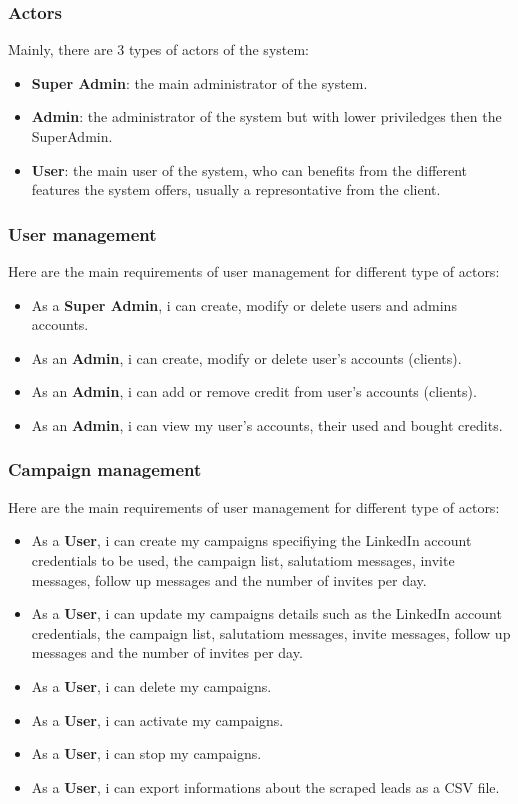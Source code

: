 \subsubsection{Actors}
Mainly, there are 3 types of actors of the system:
\begin{itemize}
  \item \textbf{Super Admin}: the main administrator of the system.
  \item \textbf{Admin}: the administrator of the system but with lower priviledges then the SuperAdmin.
  \item \textbf{User}: the main user of the system, who can benefits from the different features the system offers, usually a represontative from the client. 
\end{itemize}
\subsubsection{User management}
Here are the main requirements of user management for different type of actors:
\begin{itemize}
  \item As a \textbf{Super Admin}, i can create, modify or delete users and admins accounts.
  \item As an \textbf{Admin}, i can create, modify or delete user's accounts (clients).
  \item As an \textbf{Admin}, i can add or remove credit from user's accounts (clients).
	\item As an \textbf{Admin}, i can view my user's accounts, their used and bought credits.
\end{itemize}
\subsubsection{Campaign management}
Here are the main requirements of user management for different type of actors:
\begin{itemize}
  \item As a \textbf{User}, i can create my campaigns specifiying the LinkedIn account credentials to be used, the campaign list, salutatiom messages, invite messages, follow up messages and the number of invites per day.
  \item As a \textbf{User}, i can update my campaigns details such as the LinkedIn account credentials, the campaign list, salutatiom messages, invite messages, follow up messages and the number of invites per day.
  \item As a \textbf{User}, i can delete my campaigns.
  \item As a \textbf{User}, i can activate my campaigns.
  \item As a \textbf{User}, i can stop my campaigns.
  \item As a \textbf{User}, i can export informations about the scraped leads as a CSV file.
\end{itemize}
